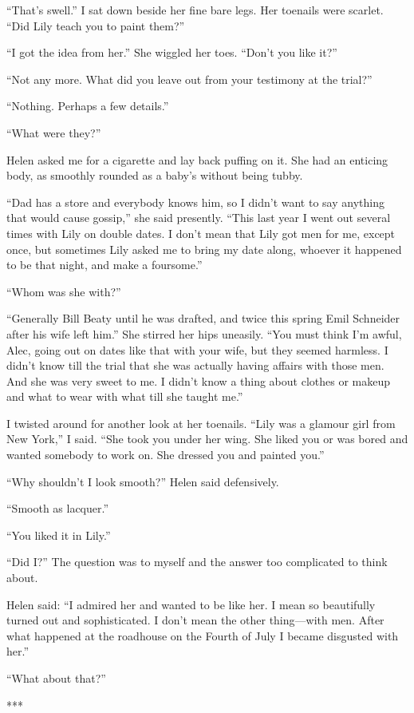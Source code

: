\documentclass{novel}
\begin{document}
{“That’s swell.” I sat down beside her fine bare legs. Her toenails were scarlet. “Did Lily teach you to paint them?”

“I got the idea from her.” She wiggled her toes. “Don’t you like it?”

“Not any more. What did you leave out from your testimony at the trial?”

“Nothing. Perhaps a few details.”

“What were they?”

Helen asked me for a cigarette and lay back puffing on it. She had an enticing body, as smoothly rounded as a baby’s without being tubby.

“Dad has a store and everybody knows him, so I didn’t want to say anything that would cause gossip,” she said presently. “This last year I went out several times with Lily on double dates. I don’t mean that Lily got men for me, except once, but sometimes Lily asked me to bring my date along, whoever it happened to be that night, and make a foursome.”

“Whom was she with?”

“Generally Bill Beaty until he was drafted, and twice this spring Emil Schneider after his wife left him.” She stirred her hips uneasily. “You must think I’m awful, Alec, going out on dates like that with your wife, but they seemed harmless. I didn’t know till the trial that she was actually having affairs with those men. And she was very sweet to me. I didn’t know a thing about clothes or makeup and what to wear with what till she taught me.”

I twisted around for another look at her toenails. “Lily was a glamour girl from New York,” I said. “She took you under her wing. She liked you or was bored and wanted somebody to work on. She dressed you and painted you.”

“Why shouldn’t I look smooth?” Helen said defensively.

“Smooth as lacquer.”

“You liked it in Lily.”

“Did I?” The question was to myself and the answer too complicated to think about.

Helen said: “I admired her and wanted to be like her. I mean so beautifully turned out and sophisticated. I don’t mean the other thing—with men. After what happened at the roadhouse on the Fourth of July I became disgusted with her.”

“What about that?”

***

}
\end{document}
